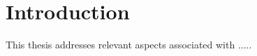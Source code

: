 \chapter{Introduction}
\label{ch1}


This thesis addresses relevant aspects associated with .....



